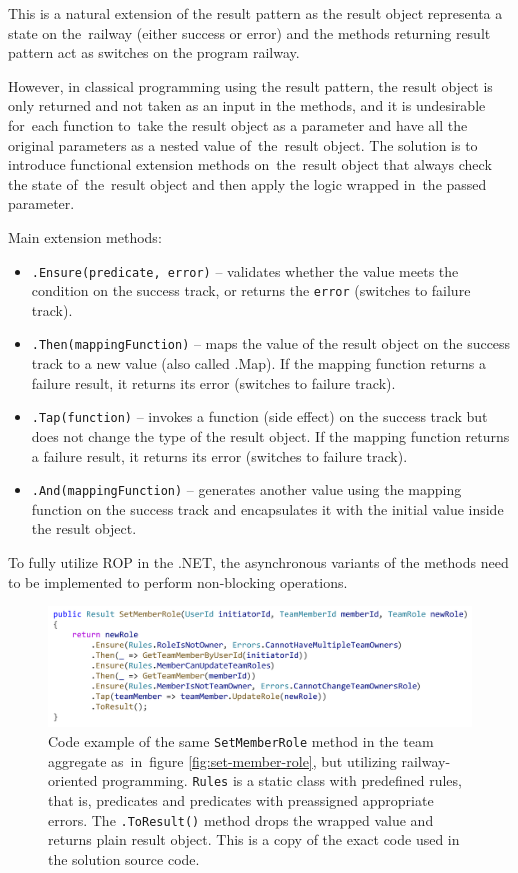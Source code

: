 This is a natural extension of the result pattern as the result object representa a state on the~railway (either success or error) and the methods returning result pattern act as switches on the program railway.

However, in classical programming using the result pattern, the result object is only returned and not taken as an input in the methods, and it is undesirable for~each function to~take the result object as a parameter and have all the original parameters as a nested value of~the~result object. The solution is to introduce functional extension methods on~the~result object that always check the state of~the~result object and then apply the logic wrapped in~the passed parameter.

Main extension methods:
\begin{itemize}
    \item \texttt{.Ensure(predicate, error)} -- validates whether the value meets the condition on the success track, or returns the \texttt{error} (switches to failure track).
    \item \texttt{.Then(mappingFunction)} -- maps the value of the result object on the success track to a new value (also called .Map). If the mapping function returns a failure result, it returns its error (switches to failure track).
    \item \texttt{.Tap(function)} -- invokes a function (side effect) on the success track but does not change the type of the result object. If the mapping function returns a failure result, it returns its error (switches to failure track).
    \item \texttt{.And(mappingFunction)} -- generates another value using the mapping function on the success track and encapsulates it with the initial value inside the result object.
\end{itemize}

To fully utilize ROP in the .NET, the asynchronous variants of the methods need to be implemented to perform non-blocking operations.

\begin{figure} [H]
    \centering
    \includegraphics[width=\textwidth]{figures/set-member-role-rop.pdf}
    \caption{Code example of the same \texttt{SetMemberRole} method in the team aggregate as~in~figure \ref{fig:set-member-role}, but utilizing railway-oriented programming. \texttt{Rules} is a static class with predefined rules, that is, predicates and predicates with preassigned appropriate errors. The \texttt{.ToResult()} method drops the wrapped value and returns plain result object. This is a copy of the exact code used in the solution source code.}
    \label{fig:set-member-role-rop}
\end{figure}

